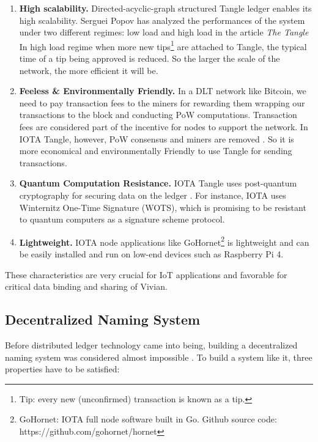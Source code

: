 \begin{enumerate}
    \item \textbf{High scalability.} Directed-acyclic-graph structured Tangle ledger enables its high scalability. Serguei Popov has analyzed the performances of the system under two different regimes: low load and high load in the article \textit{The Tangle} \cite{popov2018tangle} In high load regime when more new tips\footnote{Tip: every new (unconfirmed) transaction is known as a tip.} are attached to Tangle, the typical time of a tip being approved is reduced.
          So the larger the scale of the network, the more efficient it will be.
    \item \textbf{Feeless \& Environmentally Friendly.} In a DLT network like Bitcoin, we need to pay transaction fees to the miners for rewarding them wrapping our transactions to the block and conducting PoW computations. Transaction fees are considered part of the incentive for nodes to support the network. In IOTA Tangle, however, PoW consensus and miners are removed \cite{popov2019iota}. So it is more economical and environmentally Friendly to use Tangle for sending transactions.
    \item \textbf{Quantum Computation Resistance.} IOTA Tangle uses post-quantum cryptography for securing data on the ledger \cite{tennant2017improving}. For instance, IOTA uses Winternitz One-Time Signature (WOTS), which is promising to be resistant to quantum computers \cite{buchmann2008post} as a signature scheme protocol.
    \item \textbf{Lightweight.} IOTA node applications like GoHornet\footnote{GoHornet: IOTA full node software built in Go. Github source code: https://github.com/gohornet/hornet} is lightweight and can be easily installed and run on low-end devices such as Raspberry Pi 4.
\end{enumerate}

These characteristics are very crucial for IoT applications and favorable for critical data binding and sharing of Vivian.


\subsection{Decentralized Naming System}
Before distributed ledger technology came into being, building a decentralized naming system was considered almost impossible \cite{swartz_2011}. To build a system like it, three properties have to be satisfied:

